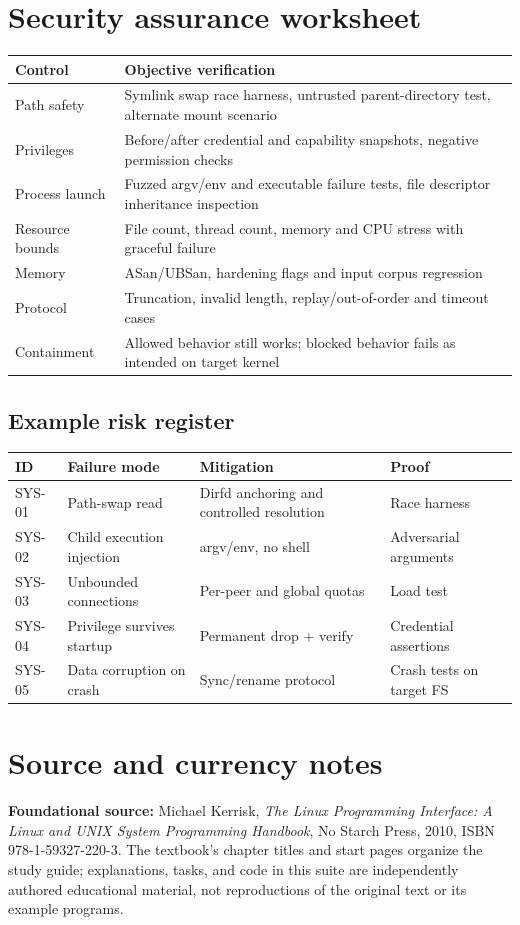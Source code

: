 \documentclass[11pt,letterpaper,oneside]{report}
\begin{document}
\chapter{Security assurance worksheet}
\begin{longtable}{p{.18\linewidth}p{.73\linewidth}}\toprule
Control & Objective verification\\\midrule\endhead
Path safety & Symlink swap race harness, untrusted parent-directory test, alternate mount scenario\\
Privileges & Before/after credential and capability snapshots, negative permission checks\\
Process launch & Fuzzed argv/env and executable failure tests, file descriptor inheritance inspection\\
Resource bounds & File count, thread count, memory and CPU stress with graceful failure\\
Memory & ASan/UBSan, hardening flags and input corpus regression\\
Protocol & Truncation, invalid length, replay/out-of-order and timeout cases\\
Containment & Allowed behavior still works; blocked behavior fails as intended on target kernel\\
\bottomrule\end{longtable}\section{Example risk register}
\begin{longtable}{p{.12\linewidth}p{.29\linewidth}p{.26\linewidth}p{.22\linewidth}}\toprule
ID & Failure mode & Mitigation & Proof\\\midrule\endhead
SYS-01 & Path-swap read & Dirfd anchoring and controlled resolution & Race harness\\
SYS-02 & Child execution injection & argv/env, no shell & Adversarial arguments\\
SYS-03 & Unbounded connections & Per-peer and global quotas & Load test\\
SYS-04 & Privilege survives startup & Permanent drop + verify & Credential assertions\\
SYS-05 & Data corruption on crash & Sync/rename protocol & Crash tests on target FS\\
\bottomrule\end{longtable}
\chapter*{Source and currency notes}
\textbf{Foundational source:} Michael Kerrisk, \emph{The Linux Programming Interface: A Linux and UNIX System Programming Handbook}, No Starch Press, 2010, ISBN 978-1-59327-220-3. The textbook's chapter titles and start pages organize the study guide; explanations, tasks, and code in this suite are independently authored educational material, not reproductions of the original text or its example programs.
\end{document}

